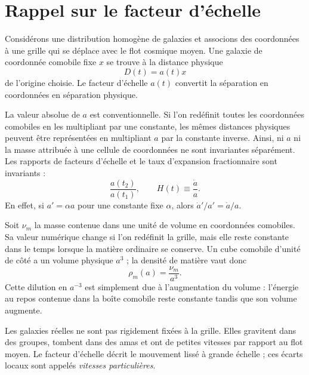 \section{Rappel sur le facteur d’échelle}

Considérons une distribution homogène de galaxies et associons des coordonnées à une grille qui se déplace avec le flot cosmique moyen. Une galaxie de coordonnée comobile fixe \(x\) se trouve à la distance physique
\begin{equation}
D(t)=a(t)x
\label{eq:c02-distance}
\end{equation}
de l’origine choisie. Le facteur d’échelle \(a(t)\) convertit la séparation en coordonnées en séparation physique.

La valeur absolue de \(a\) est conventionnelle. Si l’on redéfinit toutes les coordonnées comobiles en les multipliant par une constante, les mêmes distances physiques peuvent être représentées en multipliant \(a\) par la constante inverse. Ainsi, ni \(a\) ni la masse attribuée à une cellule de coordonnées ne sont invariantes séparément. Les rapports de facteurs d’échelle et le taux d’expansion fractionnaire sont invariants :
\begin{equation}
\frac{a(t_2)}{a(t_1)},
\qquad
H(t)\equiv\frac{\dot a}{a}.
\label{eq:c02-hubble}
\end{equation}
En effet, si \(a'=\alpha a\) pour une constante fixe \(\alpha\), alors \(\dot a'/a'=\dot a/a\).

Soit \(\nu_m\) la masse contenue dans une unité de volume en coordonnées comobiles. Sa valeur numérique change si l’on redéfinit la grille, mais elle reste constante dans le temps lorsque la matière ordinaire se conserve. Un cube comobile d’unité de côté a un volume physique \(a^3\) ; la densité de matière vaut donc
\begin{equation}
\boxed{\rho_m(a)=\frac{\nu_m}{a^3}.}
\label{eq:c02-matter-density}
\end{equation}
Cette dilution en \(a^{-3}\) est simplement due à l’augmentation du volume : l’énergie au repos contenue dans la boîte comobile reste constante tandis que son volume augmente.

Les galaxies réelles ne sont pas rigidement fixées à la grille. Elles gravitent dans des groupes, tombent dans des amas et ont de petites vitesses par rapport au flot moyen. Le facteur d’échelle décrit le mouvement lissé à grande échelle ; ces écarts locaux sont appelés \emph{vitesses particulières}.

\begin{classroomqa}
\end{classroomqa}

